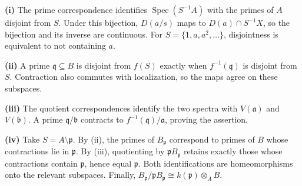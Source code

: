 \textbf{(i)} The prime correspondence identifies $\operatorname{Spec}(S^{-1}A)$ with the primes of $A$ disjoint from $S$. Under this bijection, $D(a/s)$ maps to $D(a)\cap S^{-1}X$, so the bijection and its inverse are continuous. For $S=\{1,a,a^2,\ldots\}$, disjointness is equivalent to not containing $a$.

\textbf{(ii)} A prime $\mathfrak q\subseteq B$ is disjoint from $f(S)$ exactly when $f^{-1}(\mathfrak q)$ is disjoint from $S$. Contraction also commutes with localization, so the maps agree on these subspaces.

\textbf{(iii)} The quotient correspondences identify the two spectra with $V(\mathfrak a)$ and $V(\mathfrak b)$. A prime $\mathfrak q/\mathfrak b$ contracts to $f^{-1}(\mathfrak q)/\mathfrak a$, proving the assertion.

\textbf{(iv)} Take $S=A\setminus\mathfrak p$. By (ii), the primes of $B_{\mathfrak p}$ correspond to primes of $B$ whose contractions lie in $\mathfrak p$. By (iii), quotienting by $\mathfrak pB_{\mathfrak p}$ retains exactly those whose contractions contain $\mathfrak p$, hence equal $\mathfrak p$. Both identifications are homeomorphisms onto the relevant subspaces. Finally, $B_{\mathfrak p}/\mathfrak pB_{\mathfrak p}\cong k(\mathfrak p)\otimes_A B$.

